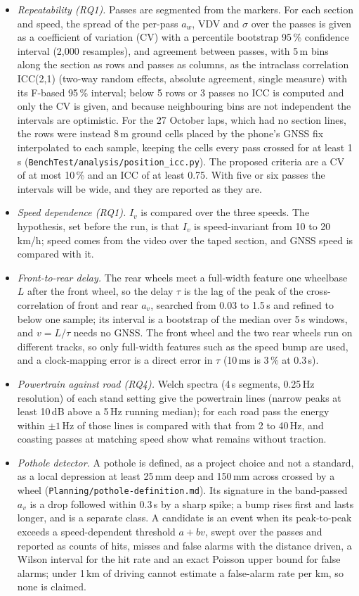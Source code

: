 \begin{itemize}
\item \emph{Repeatability (RQ1).} Passes are segmented from the markers. For each section and speed, the spread of the per-pass $a_w$, VDV and $\sigma$ over the passes is given as a coefficient of variation (CV) with a percentile bootstrap 95\,\% confidence interval (2,000 resamples), and agreement between passes, with 5\,m bins along the section as rows and passes as columns, as the intraclass correlation ICC(2,1) (two-way random effects, absolute agreement, single measure) with its F-based 95\,\% interval; below 5 rows or 3 passes no ICC is computed and only the CV is given, and because neighbouring bins are not independent the intervals are optimistic. For the 27 October laps, which had no section lines, the rows were instead 8\,m ground cells placed by the phone's GNSS fix interpolated to each sample, keeping the cells every pass crossed for at least 1\,s (\texttt{BenchTest/\allowbreak{}analysis/\allowbreak{}position\_icc.py}). The proposed criteria are a CV of at most 10\,\% and an ICC of at least 0.75. With five or six passes the intervals will be wide, and they are reported as they are.
\item \emph{Speed dependence (RQ1).} $I_v$ is compared over the three speeds. The hypothesis, set before the run, is that $I_v$ is speed-invariant from 10 to 20\,km/h; speed comes from the video over the taped section, and GNSS speed is compared with it.
\item \emph{Front-to-rear delay.} The rear wheels meet a full-width feature one wheelbase $L$ after the front wheel, so the delay $\tau$ is the lag of the peak of the cross-correlation of front and rear $a_v$, searched from 0.03 to 1.5\,s and refined to below one sample; its interval is a bootstrap of the median over 5\,s windows, and $v = L/\tau$ needs no GNSS. The front wheel and the two rear wheels run on different tracks, so only full-width features such as the speed bump are used, and a clock-mapping error is a direct error in $\tau$ (10\,ms is 3\,\% at 0.3\,s).
\item \emph{Powertrain against road (RQ4).} Welch spectra (4\,s segments, 0.25\,Hz resolution) of each stand setting give the powertrain lines (narrow peaks at least 10\,dB above a 5\,Hz running median); for each road pass the energy within $\pm 1$\,Hz of those lines is compared with that from 2 to 40\,Hz, and coasting passes at matching speed show what remains without traction.
\item \emph{Pothole detector.} A pothole is defined, as a project choice and not a standard, as a local depression at least 25\,mm deep and 150\,mm across crossed by a wheel (\texttt{Planning/\allowbreak{}pothole-definition.md}). Its signature in the band-passed $a_v$ is a drop followed within 0.3\,s by a sharp spike; a bump rises first and lasts longer, and is a separate class. A candidate is an event when its peak-to-peak exceeds a speed-dependent threshold $a + bv$, swept over the passes and reported as counts of hits, misses and false alarms with the distance driven, a Wilson interval for the hit rate and an exact Poisson upper bound for false alarms; under 1\,km of driving cannot estimate a false-alarm rate per km, so none is claimed.
\end{itemize}
